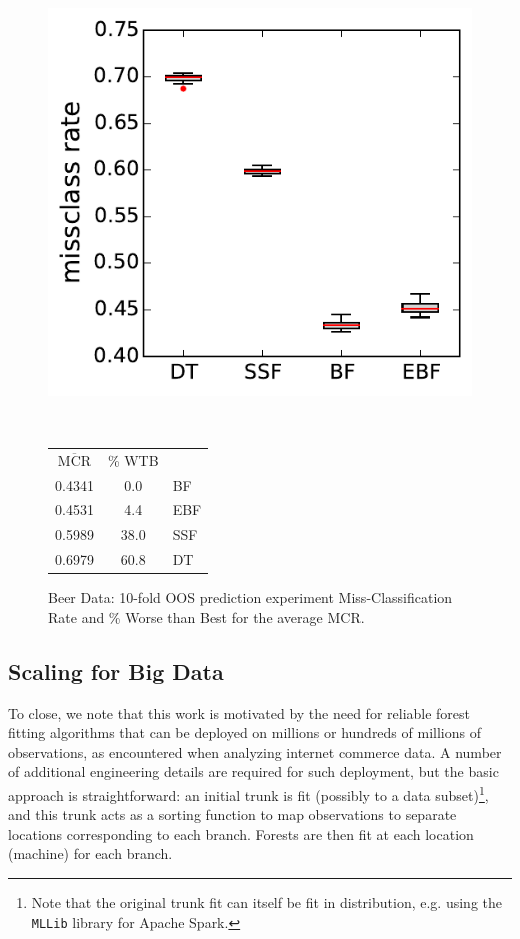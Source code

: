 \documentclass{article}
\begin{document}
\begin{figure}
\begin{minipage}{0.5\linewidth}
\includegraphics[width=\textwidth]{../graphs/beer}
\end{minipage}
~~
\begin{minipage}{0.4\linewidth}
{\footnotesize
\begin{tabular}{c c | l}
$\overline{\text{MCR}}$  & \% WTB & \\
\cline{1-2}\rule{0pt}{3ex} 
0.4341 &  0.0 & BF \\
0.4531 &  4.4 & EBF \\
0.5989 & 38.0 & SSF \\
0.6979 & 60.8 & DT \\
\end{tabular}}
\end{minipage}
\caption{\label{beer} Beer Data: 10-fold OOS prediction experiment Miss-Classification Rate and \% Worse than Best for the average MCR. }
\end{figure}

\subsection{Scaling for Big Data}

To close, we note that this work is motivated by the need for reliable forest fitting algorithms that can be deployed on millions or hundreds of millions of observations, as encountered when analyzing internet commerce data.  A number of additional engineering details are required for such deployment, but the basic approach is straightforward:  an initial trunk is fit (possibly to a data subset)\footnote{Note that the original trunk fit can itself be fit in distribution, e.g. using the \texttt{MLLib} library for Apache Spark.}, and this trunk  acts as a sorting function to map observations to 
separate locations corresponding to each branch.  Forests are then fit at each location (machine) for each branch.  
\end{document}
